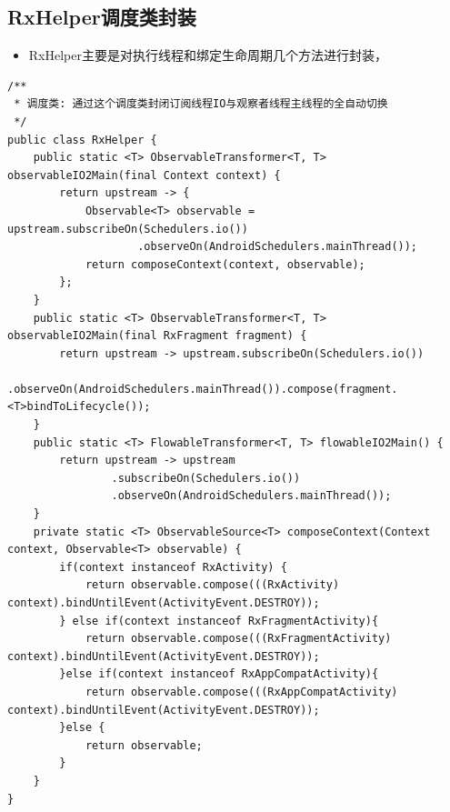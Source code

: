 \documentclass[9pt, b5paper]{article}
\begin{document}
\subsection{RxHelper调度类封装}
\label{sec-18-2}
\begin{itemize}
\item RxHelper主要是对执行线程和绑定生命周期几个方法进行封装，
\end{itemize}
\begin{verbatim}
/**
 * 调度类: 通过这个调度类封闭订阅线程IO与观察者线程主线程的全自动切换
 */
public class RxHelper {
    public static <T> ObservableTransformer<T, T> observableIO2Main(final Context context) {
        return upstream -> {
            Observable<T> observable = upstream.subscribeOn(Schedulers.io())
                    .observeOn(AndroidSchedulers.mainThread());
            return composeContext(context, observable);
        };
    }
    public static <T> ObservableTransformer<T, T> observableIO2Main(final RxFragment fragment) {
        return upstream -> upstream.subscribeOn(Schedulers.io())
                .observeOn(AndroidSchedulers.mainThread()).compose(fragment.<T>bindToLifecycle());
    }
    public static <T> FlowableTransformer<T, T> flowableIO2Main() {
        return upstream -> upstream
                .subscribeOn(Schedulers.io())
                .observeOn(AndroidSchedulers.mainThread());
    }
    private static <T> ObservableSource<T> composeContext(Context context, Observable<T> observable) {
        if(context instanceof RxActivity) {
            return observable.compose(((RxActivity) context).bindUntilEvent(ActivityEvent.DESTROY));
        } else if(context instanceof RxFragmentActivity){
            return observable.compose(((RxFragmentActivity) context).bindUntilEvent(ActivityEvent.DESTROY));
        }else if(context instanceof RxAppCompatActivity){
            return observable.compose(((RxAppCompatActivity) context).bindUntilEvent(ActivityEvent.DESTROY));
        }else {
            return observable;
        }
    }
}
\end{verbatim}
\end{document}
